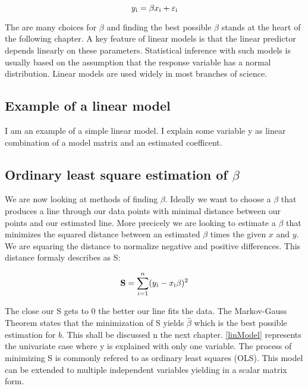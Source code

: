 \documentclass{article}
\begin{document}
    \begin{equation}  \label{linModel} y\textsubscript{i} = \beta x\textsubscript{i} + \varepsilon\textsubscript{i} \end{equation}

    The are many choices for $\beta$ and finding the best possible $\beta$ stands at the heart of the following chapter. A key feature of linear models is that the linear predictor depends linearly on these parameters. Statistical inference with such models is usually based on the assumption that the response variable has a normal distribution. Linear models are used widely in most branches of science.

    \subsection{Example of a linear model}
    I am an example of a simple linear model. I explain some variable y as linear combination of a model matrix and an estimated coefficent.

    \subsection{Ordinary least square estimation of $\beta$}

    We are now looking at methods of finding $\beta$. Ideally we want to choose a $\beta$ that produces a line through our data points with minimal distance between our points and our estimated line. More precicely we are
    looking to estimate a $\beta$ that minimizes the squared distance between an estimated $\beta$ times the given $x$ and $y$. We are squaring the distance to normalize negative and positive differences. This distance formaly describes as S:

    \begin{equation} \label{sumSquares} \mathbf{S} =  \sum_{i=1}^{n}(y\textsubscript{i} - x\textsubscript{i}\beta)^{2} \end{equation}

    The close our S gets to 0 the better our line fits the data. The  Markov-Gauss Theorem states that the minimization of S yields $\widehat{\beta}$ which is the best possible estimation for $b$. This shall be discussed n the next chapter.  \ref{linModel} represents the univariate case where y is explained with only one variable. The process of minimizing S is commonly refered to as ordinary least squares (OLS). This model can be extended to multiple independent variables yielding in a scalar matrix form.
\end{document}
